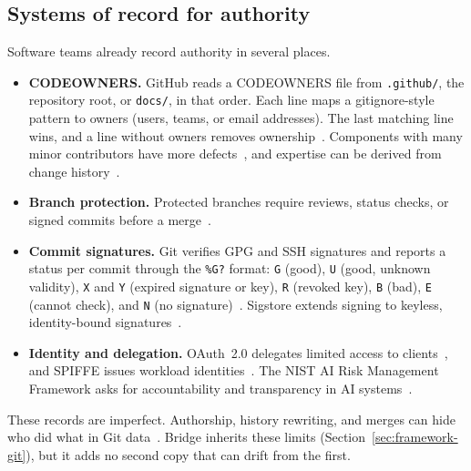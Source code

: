 \subsection{Systems of record for authority}
Software teams already record authority in several places.
\begin{itemize}
    \item \textbf{CODEOWNERS.} GitHub reads a CODEOWNERS file from \texttt{.github/}, the repository root, or \texttt{docs/}, in that order. Each line maps a gitignore-style pattern to owners (users, teams, or email addresses). The last matching line wins, and a line without owners removes ownership~\cite{githubcodeowners}. Components with many minor contributors have more defects~\cite{bird2011ownership}, and expertise can be derived from change history~\cite{mockus2002expertise}.
    \item \textbf{Branch protection.} Protected branches require reviews, status checks, or signed commits before a merge~\cite{githubbranchprotection}.
    \item \textbf{Commit signatures.} Git verifies GPG and SSH signatures and reports a status per commit through the \texttt{\%G?} format: \texttt{G} (good), \texttt{U} (good, unknown validity), \texttt{X} and \texttt{Y} (expired signature or key), \texttt{R} (revoked key), \texttt{B} (bad), \texttt{E} (cannot check), and \texttt{N} (no signature)~\cite{gitlog}. Sigstore extends signing to keyless, identity-bound signatures~\cite{newman2022sigstore}.
    \item \textbf{Identity and delegation.} OAuth~2.0 delegates limited access to clients~\cite{rfc6749}, and SPIFFE issues workload identities~\cite{spiffe2026}. The NIST AI Risk Management Framework asks for accountability and transparency in AI systems~\cite{nist2023airmf}.
\end{itemize}
These records are imperfect. Authorship, history rewriting, and merges can hide who did what in Git data~\cite{bird2009git}. Bridge inherits these limits (Section~\ref{sec:framework-git}), but it adds no second copy that can drift from the first.
